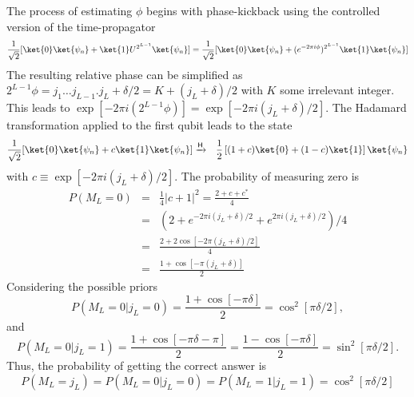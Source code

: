 \documentclass[11pt,oneside,final]{huthesis}%
\begin{document}
The process of estimating $\phi$ begins with phase-kickback using the controlled version of the time-propagator
\begin{equation*}
	\frac{1}{\sqrt{2}}[\ket{0}\ket{\psi_n}+\ket{1}U^{2^{L-1}}\ket{\psi_n}]=\frac{1}{\sqrt{2}}[\ket{0}\ket{\psi_n}+(e^{-2\pi i \phi})^{2^{L-1}}\ket{1}\ket{\psi_n}]
\end{equation*}
The resulting relative phase can be simplified as $2^{L-1}\phi=j_1\dots j_{L-1}.j_L+\delta/2=K+(j_L+\delta)/2$ with $K$ some irrelevant integer.  This leads to $\exp[-2\pi i (2^{L-1}\phi)]=\exp[-2\pi i (j_L+\delta)/2]$. The Hadamard transformation applied to the first qubit leads to the state
\begin{eqnarray}
	\frac{1}{\sqrt{2}}[\ket{0}\ket{\psi_n}+c\ket{1}\ket{\psi_n}]&\xrightarrow{\sf H}&\frac{1}{2} \left[ (1+c)\ket{0}+(1-c)\ket{1} \right]\ket{\psi_n}
	\label{eq:6}
\end{eqnarray}
with $c\equiv \exp[-2\pi i (j_{L}+\delta)/2]$.  The probability of measuring zero is
\begin{eqnarray}
	P(M_L=0)&=& \frac{1}{4}|c+1|^2=\frac{2+c+c^*}{4}\label{eq:7}\\
	&=& (2+ e^{-2\pi i (j_{L}+\delta)/2}+e^{2\pi i (j_{L}+\delta)/2})/4\nonumber\\
	&=& \frac{2+ 2\cos[-2\pi  (j_{L}+\delta)/2]}{4}\nonumber\\
	&=& \frac{1+ \cos[-\pi  (j_{L}+\delta)]}{2}\nonumber
\end{eqnarray}
Considering the possible priors
$$P(M_L=0|j_L=0)=  \frac{1+ \cos[-\pi  \delta]}{2}=\cos^2[\pi\delta/2],$$
and $$P(M_L=0|j_L=1)=  \frac{1+ \cos[-\pi\delta-\pi]}{2}=\frac{1- \cos[-\pi\delta]}{2}=\sin^2[\pi\delta/2].$$
Thus, the probability of getting the correct answer is 
\begin{equation}
	P(M_L=j_L)=P(M_L=0|j_L=0)=P(M_L=1|j_L=1)=\cos^2[\pi\delta/2]
	\label{eq:17}
\end{equation}
\end{document}

